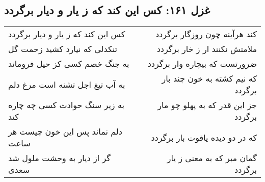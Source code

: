 \begin{center}
\section*{غزل ۱۶۱: کس این کند که ز یار و دیار برگردد}
\label{sec:161}
\begin{longtable}{l p{0.5cm} r}
کس این کند که ز یار و دیار برگردد
&&
کند هرآینه چون روزگار برگردد
\\
تنکدلی که نیارد کشید زحمت گل
&&
ملامتش نکنند ار ز خار برگردد
\\
به جنگ خصم کسی کز حیل فروماند
&&
ضرورتست که بیچاره وار برگردد
\\
به آب تیغ اجل تشنه است مرغ دلم
&&
که نیم کشته به خون چند بار برگردد
\\
به زیر سنگ حوادث کسی چه چاره کند
&&
جز این قدر که به پهلو چو مار برگردد
\\
دلم نماند پس این خون چیست هر ساعت
&&
که در دو دیده یاقوت بار برگردد
\\
گر از دیار به وحشت ملول شد سعدی
&&
گمان مبر که به معنی ز یار برگردد
\\
\end{longtable}
\end{center}
